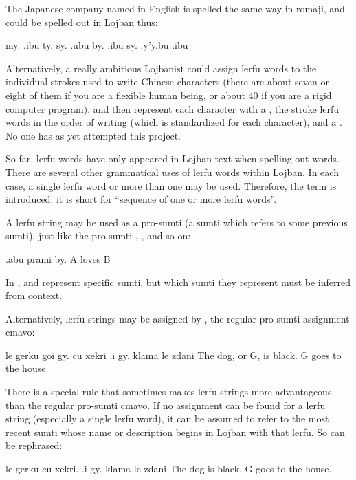 The Japanese company named  in English is
    spelled the same way in romaji, and could be spelled out in
    Lojban thus:
\begin{example}
my. .ibu ty. sy. .ubu by. .ibu sy. .y'y.bu .ibu\n
{}         
\end{example}

Alternatively, a really ambitious Lojbanist could assign lerfu
    words to the individual strokes used to write Chinese
    characters (there are about seven or eight of them if you are a
    flexible human being, or about 40 if you are a rigid computer
    program), and then represent each character with a , the
    stroke lerfu words in the order of writing (which is
    standardized for each character), and a . No one has as
    yet attempted this project.



So far, lerfu words have only appeared in Lojban text when
    spelling out words. There are several other grammatical uses of
    lerfu words within Lojban. In each case, a single lerfu word or
    more than one may be used. Therefore, the term 
    is introduced: it is short for ``sequence of one or more lerfu
    words''.

A lerfu string may be used as a pro-sumti (a sumti which
    refers to some previous sumti), just like the pro-sumti
    , , and so on:
\begin{example}
.abu prami by.\n
A loves B
\end{example}

In ,  and 
    represent specific sumti, but which sumti they represent must
    be inferred from context.

Alternatively, lerfu strings may be assigned by , the
    regular pro-sumti assignment cmavo:
\begin{example}
le gerku goi gy. cu xekri .i gy. klama le zdani\n
The dog, or G, is black.  G goes to the house.
\end{example}

There is a special rule that sometimes makes lerfu strings more
    advantageous than the regular pro-sumti cmavo. If no assignment
    can be found for a lerfu string (especially a single lerfu
    word), it can be assumed to refer to the most recent sumti
    whose name or description begins in Lojban with that lerfu. So can be rephrased:
\begin{example}
le gerku cu xekri. .i gy. klama le zdani\n
The dog is black.  G goes to the house.
\end{example}

